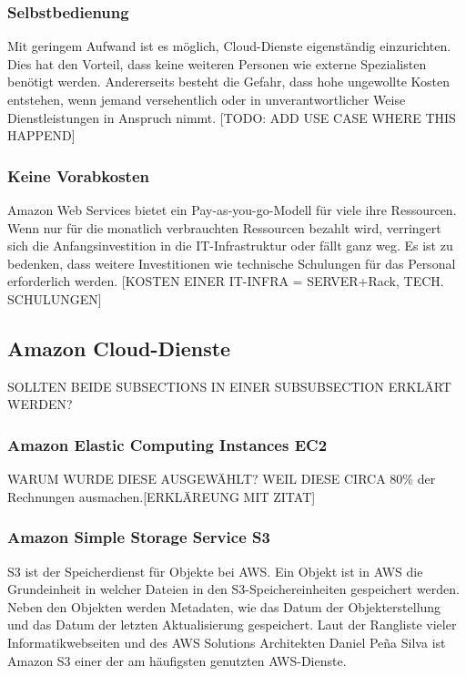 \subsubsection{Selbstbedienung}
Mit geringem Aufwand ist es möglich, Cloud-Dienste eigenständig einzurichten. Dies hat den Vorteil, dass keine weiteren Personen wie externe Spezialisten benötigt werden.
Andererseits besteht die Gefahr, dass hohe ungewollte Kosten entstehen, wenn jemand versehentlich oder in unverantwortlicher Weise Dienstleistungen in Anspruch nimmt.
      [TODO: ADD USE CASE WHERE THIS HAPPEND]

\subsubsection{Keine Vorabkosten}
Amazon Web Services bietet ein Pay-as-you-go-Modell für viele ihre Ressourcen. %
Wenn nur für die monatlich verbrauchten Ressourcen bezahlt wird, verringert sich die Anfangsinvestition in die IT-Infrastruktur oder fällt ganz weg. Es ist zu bedenken, dass weitere Investitionen wie technische Schulungen für das Personal erforderlich werden. [KOSTEN EINER IT-INFRA = SERVER+Rack, TECH. SCHULUNGEN]

\subsection{Amazon Cloud-Dienste}
SOLLTEN BEIDE SUBSECTIONS IN EINER SUBSUBSECTION ERKLÄRT WERDEN?
\subsubsection{Amazon Elastic Computing Instances EC2 }
WARUM WURDE DIESE AUSGEWÄHLT? WEIL DIESE CIRCA 80\% der Rechnungen ausmachen.[ERKLÄREUNG MIT ZITAT]
\subsubsection{Amazon Simple Storage Service S3}
S3 ist der Speicherdienst für Objekte bei AWS. Ein Objekt ist in AWS die Grundeinheit in welcher Dateien in den S3-Speichereinheiten gespeichert werden.
\\
Neben den Objekten werden Metadaten, wie das Datum der Objekterstellung und das Datum der letzten Aktualisierung gespeichert. Laut der Rangliste vieler Informatikwebseiten und des
AWS Solutions Architekten Daniel Peña Silva{\cite{STA1}} ist Amazon S3 einer der am häufigsten genutzten AWS-Dienste.

